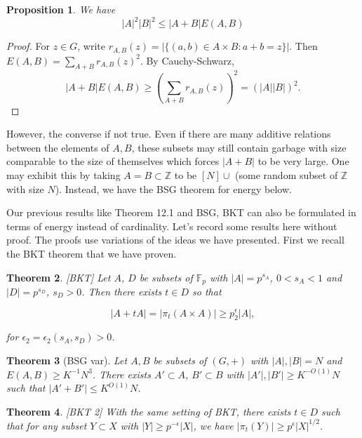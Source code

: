 \documentclass[12pt]{amsart}
\newtheorem{theorem}{Theorem}[section]
\newtheorem{prop}[theorem]{Proposition}
\begin{document}
\begin{prop}
    We have 
    \begin{equation*}
        |A|^2 |B|^2 \le |A+B| E(A,B)
    \end{equation*}
\end{prop}

\begin{proof}
    For $z \in G$, write $r_{A,B}(z) = |\{(a,b) \in A\times B: a + b = z\}|$. Then $E(A,B) = \sum_{A+B} r_{A,B}(z)^2$. By Cauchy-Schwarz,
    \begin{equation*}
        |A+B|E(A,B) \ge \left( \sum_{A+B} r_{A,B}(z)\right)^2 = (|A||B|)^2.
    \end{equation*}
\end{proof}

However, the converse if not true. Even if there are many additive relations between the elements of $A,B$, these subsets may still contain garbage with size comparable to the size of themselves which forces $|A+B|$ to be very large. One may exhibit this by taking $A=B \subset \mathbb{Z}$ to be $[N] \cup$ (some random subset of $\mathbb{Z}$ with size $N$). Instead, we have the BSG theorem for energy below.

Our previous results like Theorem 12.1 and BSG, BKT can also be formulated in terms of energy instead of cardinality. Let's record some results here without proof.   The proofs use variations of the ideas we have presented.  First we recall the BKT theorem that we have proven.

\begin{theorem} \label{thmbktref} [BKT]
    Let $A$, $D$ be subsets of $\mathbb{F}_p$ with $|A| = p^{s_A}$, $0 < s_A< 1$ and $|D| = p^{s_D}$, $s_D > 0$. Then there exists $t \in D$ so that
    
    $$|A + tA| = |\pi_t(A \times A)| \ge p^\epsilon_2 |A|, $$
 
    for $\epsilon_2 = \epsilon_2(s_A, s_D) > 0$.
\end{theorem}

\begin{theorem}[BSG var]
     Let $A,B$ be subsets of $(G,+)$ with $|A|, |B| = N$ and $E(A,B) \ge K^{-1} N^3$. There exists $A' \subset A$, $B' \subset B$ with $|A'|, |B'|\ge K^{-O(1)} N$ such that $|A'+B'| \le K^{O(1)}N$.
\end{theorem}

\begin{theorem} \label{thmbktrobust} [BKT 2]
    With the same setting of BKT, there exists $t \in D$ such that for any subset $Y \subset X$ with $|Y| \ge p^{-\epsilon} |X|$, we have $|\pi_t(Y)| \ge p^\epsilon |X|^{1/2}$.
\end{theorem}
\end{document}
